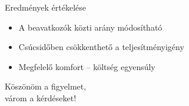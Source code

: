 \documentclass[14pt,handout]{beamer}
\newcommand\Fontvi{\fontsize{6}{7.2}\selectfont}
\begin{document}
\begin{frame}
\end{frame}
%
%
%
%


\begin{frame}{Eredmények értékelése}
\begin{itemize}
	\setlength{\itemsep}{6pt}
	\item A beavatkozók közti arány módosítható
	\item Csúcsidőben csökkenthető a teljesítményigény
	\item Megfelelő komfort -- költség egyensúly
\end{itemize}
\end{frame}


\begin{frame}{}
	\begin{center}
		\vspace{18pt}
		\large
		{ 
			Köszönöm a figyelmet, \\
			várom a kérdéseket!
		}
	\end{center}
\end{frame}
\end{document}
